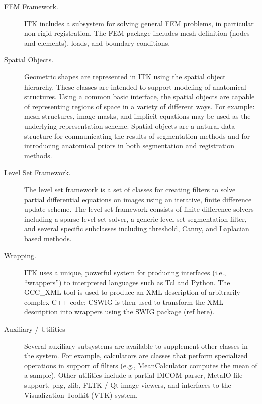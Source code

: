 \begin{description}
	\item[FEM Framework.] ITK includes a subsystem for solving general
        FEM problems, in particular non-rigid registration. The FEM package
        includes mesh definition (nodes and elements), loads, and boundary
        conditions.

	\item[Spatial Objects.] Geometric shapes are represented in ITK using
        the spatial object hierarchy.  These classes are intended to support
        modeling of anatomical structures. Using a common basic interface,
        the spatial objects are capable of representing regions of space in a
        variety of different ways. For example: mesh structures, image masks,
        and implicit equations may be used as the underlying representation
        scheme.  Spatial objects are a natural data structure for
        communicating the results of segmentation methods and for introducing
        anatomical priors in both segmentation and registration methods.

	\item[Level Set Framework.] The level set framework is a set of
        classes for creating filters to solve partial differential equations
        on images using an iterative, finite difference update scheme. The
        level set framework consists of finite difference solvers including a
        sparse level set solver, a generic level set segmentation filter, and
        several specific subclasses including threshold, Canny, and Laplacian
        based methods.

	\item[Wrapping.] ITK uses a unique, powerful system for producing
        interfaces (i.e., ``wrappers'') to interpreted languages such as Tcl
        and Python. The GCC_XML tool is used to produce an XML description of
        arbitrarily complex C++ code; CSWIG is then used to transform the XML
        description into wrappers using the SWIG package (ref here).

	\item[Auxiliary / Utilities] Several auxiliary subsystems are 
        available to supplement other classes in the system. For example,
        calculators are classes that perform specialized operations in
        support of filters (e.g., MeanCalculator computes the mean of a
        sample). Other utilities include a partial DICOM parser, MetaIO file
        support, png, zlib, FLTK / Qt image viewers, and interfaces to the
        Visualization Toolkit (VTK) system.
        
\end{description}


